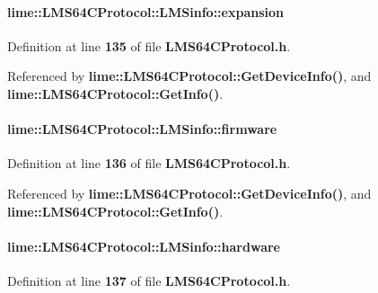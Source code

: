 \paragraph[{expansion}]{ lime\+::\+L\+M\+S64\+C\+Protocol\+::\+L\+M\+Sinfo\+::expansion}\label{structlime_1_1LMS64CProtocol_1_1LMSinfo_abf88d045d2301efb064c8f3c9a410339}


Definition at line {\bf 135} of file {\bf L\+M\+S64\+C\+Protocol.\+h}.



Referenced by {\bf lime\+::\+L\+M\+S64\+C\+Protocol\+::\+Get\+Device\+Info()}, and {\bf lime\+::\+L\+M\+S64\+C\+Protocol\+::\+Get\+Info()}.

\paragraph[{firmware}]{ lime\+::\+L\+M\+S64\+C\+Protocol\+::\+L\+M\+Sinfo\+::firmware}\label{structlime_1_1LMS64CProtocol_1_1LMSinfo_a247955c68d3f98b29e095649ff19cb33}


Definition at line {\bf 136} of file {\bf L\+M\+S64\+C\+Protocol.\+h}.



Referenced by {\bf lime\+::\+L\+M\+S64\+C\+Protocol\+::\+Get\+Device\+Info()}, and {\bf lime\+::\+L\+M\+S64\+C\+Protocol\+::\+Get\+Info()}.

\paragraph[{hardware}]{ lime\+::\+L\+M\+S64\+C\+Protocol\+::\+L\+M\+Sinfo\+::hardware}\label{structlime_1_1LMS64CProtocol_1_1LMSinfo_a85c292004b852789f4043a924bb3d377}


Definition at line {\bf 137} of file {\bf L\+M\+S64\+C\+Protocol.\+h}.



